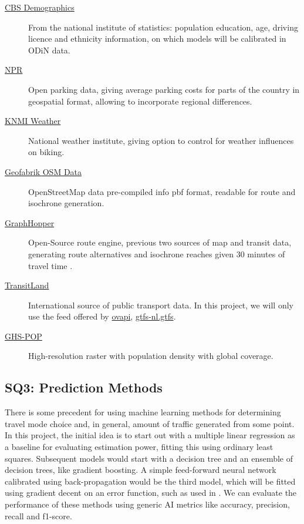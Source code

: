 \documentclass[sigconf, natbib=false, nonacm]{acmart}
\begin{document}
    \begin{description}
        \item[\href{https://opendata.cbs.nl/statline/}{CBS Demographics}] From the national institute of statistics: population education, age, driving licence and ethnicity information, on which models will be calibrated in ODiN data. 
        \item[\href{https://www.nationaalparkeerregister.nl/open-parkeerdata}{NPR}] Open parking data, giving average parking costs for parts of the country in geospatial format, allowing to incorporate regional differences. 
        \item[\href{https://www.knmi.nl/nederland-nu/klimatologie/daggegevens}{KNMI Weather}] National weather institute, giving option to control for weather influences on biking.
        \item[\href{https://download.geofabrik.de/}{Geofabrik OSM Data}] OpenStreetMap data pre-compiled info pbf format, readable for route and isochrone generation. 
        \item[\href{https://www.graphhopper.com/}{GraphHopper}] Open-Source route engine, previous two sources of map and transit data, generating route alternatives and isochrone reaches given 30 minutes of travel time \parencite{marchetti_anthropological_1994}.
        \item[\href{https://www.transit.land/map}{TransitLand}] International source of public transport data. In this project, we will only use the feed offered by \href{http://ovapi.nl/}{ovapi}, \href{https://www.transit.land/map}{gtfs-nl.gtfs}.
        \item[\href{https://ghsl.jrc.ec.europa.eu/ghs_pop.php}{GHS-POP}] High-resolution raster with population density with global coverage.
    \end{description}
    
    \subsection{SQ3: Prediction Methods}\label{SQ3:predictionmethods}
    There is some precedent for using machine learning methods for determining travel mode choice and, in general, amount of traffic generated from some point. In this project, the initial idea is to start out with a multiple linear regression as a baseline for evaluating estimation power, fitting this using ordinary least squares. Subsequent models would start with a decision tree and an ensemble of decision trees, like gradient boosting. A simple feed-forward neural network calibrated using back-propagation would be the third model, which will be fitted using gradient decent on an error function, such as used in \cite{lee_comparison_2018}. We can evaluate the performance of these methods using generic AI metrics like accuracy, precision, recall and f1-score.
\end{document}
